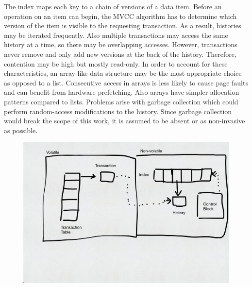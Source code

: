 The index maps each key to a chain of versions of a data item. Before an
operation on an item can begin, the MVCC algorithm has to determine which
version of the item is visible to the requesting transaction. As a result,
histories may be iterated frequently. Also multiple transactions may access the
same history at a time, so there may be overlapping accesses. However,
transactions never remove and only add new versions at the back of the history.
Therefore, contention may be high but mostly read-only. In order to account for
these characteristics, an array-like data structure may be the most appropriate
choice as opposed to a list. Consecutive access in arrays is less likely to
cause page faults and can benefit from hardware prefetching. Also arrays have
simpler allocation patterns compared to lists. Problems arise with garbage
collection which could perform random-access modifications to the history. Since
garbage collection would break the scope of this work, it is assumed to be
absent or as non-invasive as possible.


\begin{figure}[!ht]
    \centering
    \includegraphics[width=\textwidth]{figures/drafts/concept-struct-complete.pdf}
    \caption{}
    \label{fig:concept-struct-complete}
\end{figure}
